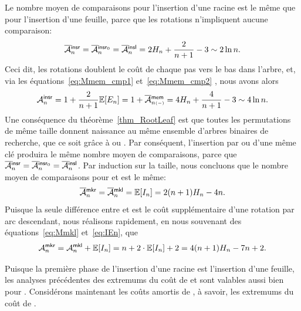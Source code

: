 Le nombre moyen de comparaisons pour l'insertion d'une racine est le
même que pour l'insertion d'une feuille, parce que les rotations
n'impliquent aucune comparaison:
\begin{equation*}
\OM{\fun{insr}}{n} = \OM{\fun{insr}_0}{n} = \OM{\fun{insl}}{n}
= 2H_n + \frac{2}{n+1} - 3 \sim 2\ln n.
\index{insr@$\OM{\fun{insr}}{n}$}
\index{insr0@$\OM{\fun{insr}_0}{n}$}
\end{equation*}
Ceci dit, les rotations doublent le coût de chaque pas vers le bas
dans l'arbre, et, via les équations~\eqref{eq:Mmem_cmp1}
et~\eqref{eq:Mmem_cmp2} , nous avons alors
\begin{equation*}
\M{\fun{insr}}{n} = 1 + \frac{2}{n+1}\Expected{E_n} = 1 +
\OM{\fun{mem}}{n{\scriptscriptstyle(-)}} = 4H_n + \frac{4}{n+1} - 3
\sim 4\ln n.
\index{insr@$\M{\fun{insr}}{n}$}
\end{equation*}
Une conséquence du théorème~\eqref{thm_RootLeaf}
 est que toutes les permutations de même taille
donnent naissance au même ensemble d'arbres binaires de recherche, que
ce soit grâce à  ou . Par conséquent,
l'insertion par  ou  d'une même clé produira
le même nombre moyen de comparaisons, parce que \(\OM{\fun{insr}}{n} =
\OM{\fun{insr}_0}{n} = \OM{\fun{insl}}{n}\). Par induction sur la
taille, nous concluons que le nombre moyen de comparaisons pour
 et  est le même:
\begin{equation*}
\OM{\fun{mkr}}{n} = \OM{\fun{mkl}}{n} = \Expected{I_n}
= 2(n+1)H_n - 4n.
\index{mkr@$\OM{\fun{mkr}}{n}$}
\end{equation*}
Puisque la seule différence entre  et  est le
coût supplémentaire d'une rotation par arc descendant, nous réalisons
rapidement, en nous souvenant des équations~\eqref{eq:Mmkl}
et~\eqref{eq:IEn}, que
\begin{equation*}
\M{\fun{mkr}}{n} = \M{\fun{mkl}}{n} + \Expected{I_n}
= n + 2 \cdot \Expected{I_n} + 2 = 4(n+1)H_n - 7n + 2.
\index{mkr@$\M{\fun{mkr}}{n}$}
\end{equation*}


Puisque la première phase de l'insertion d'une racine est l'insertion
d'une feuille, les analyses précédentes des extremums du coût de
 et  sont valables aussi bien pour
. Considérons maintenant les coûts amortis de
, à savoir, les extremums du coût de .

